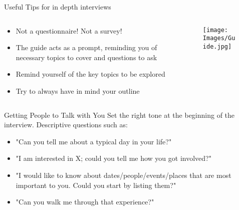 \documentclass[10pt, aspectratio=169]{beamer}
\begin{document}
            
\begin{frame}{Useful Tips for in depth interviews}
    \begin{columns}[T]
        \begin{column}{0.6\textwidth}
    \begin{itemize}
                \item Not a questionnaire! Not a survey!\vspace{0.3cm}
                \item The guide acts as a prompt, reminding you of necessary topics to cover and questions to ask \vspace{0.3cm}
                \item Remind yourself of the key topics to be explored\vspace{0.3cm}
                \item Try to always have in mind your outline
    \end{itemize}
    \end{column}
    \begin{column}{0.4\textwidth}
    \begin{figure}
        \centering
        \texttt{[image: Images/Guide.jpg]}
        \label{fig:enter-label}
    \end{figure}
    \end{column}
    \end{columns}
\end{frame}

\begin{frame}{Getting People to Talk with You}
    Set the right tone at the beginning of the interview.
\vspace{0.3cm}
    Descriptive questions such as:
    \begin{itemize}
        \item "Can you tell me about a typical day in your life?"\vspace{0.3cm}
        \item "I am interested in X; could you tell me how you got involved?"\vspace{0.3cm}
        \item "I would like to know about dates/people/events/places that are most important to you. Could you start by listing them?"\vspace{0.3cm}
        \item "Can you walk me through that experience?"
    \end{itemize}
\end{frame}
\end{document}
